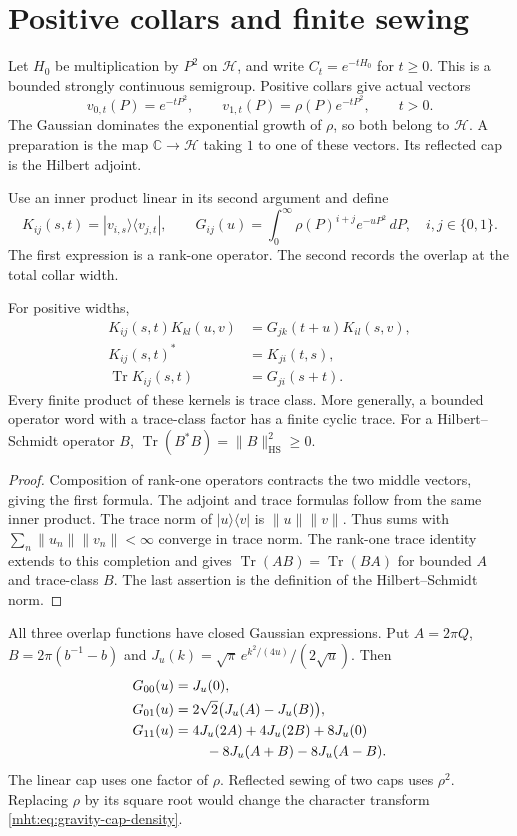 \section{Positive collars and finite sewing}

Let $H_0$ be multiplication by $P^2$ on $\mathcal H$, and write
$C_t=e^{-tH_0}$ for $t\geq0$. This is a bounded strongly continuous
semigroup. Positive collars give actual vectors
\[
 v_{0,t}(P)=e^{-tP^2},\qquad
 v_{1,t}(P)=\rho(P)e^{-tP^2},\qquad t>0.
\]
The Gaussian dominates the exponential growth of $\rho$, so both
belong to $\mathcal H$. A preparation is the map
$\mathbb C\to\mathcal H$ taking $1$ to one of these vectors.
Its reflected cap is the Hilbert adjoint.

Use an inner product linear in its second argument and define
\[
 K_{ij}(s,t)=|v_{i,s}\rangle\langle v_{j,t}|,\qquad
 G_{ij}(u)=\int_0^\infty\rho(P)^{i+j}e^{-uP^2}\,dP,
 \quad i,j\in\{0,1\}.
\]
The first expression is a rank-one operator. The second records the
overlap at the total collar width.

\begin{proposition}\label{mht:prop:gravity-prepared-sewing}
For positive widths,
\[
 \begin{split}
 K_{ij}(s,t)K_{k l}(u,v)
     &=G_{jk}(t+u)K_{i l}(s,v),\\
 K_{ij}(s,t)^*&=K_{ji}(t,s),\\
 \operatorname{Tr}K_{ij}(s,t)&=G_{ji}(s+t).
 \end{split}
\]
Every finite product of these kernels is trace class. More generally,
a bounded operator word with a trace-class factor has a finite cyclic
trace. For a Hilbert--Schmidt operator $B$,
$\operatorname{Tr}(B^*B)=\|B\|_{\mathrm{HS}}^2\geq0$.
\end{proposition}

\begin{proof}
Composition of rank-one operators contracts the two middle vectors,
giving the first formula. The adjoint and trace formulas follow from
the same inner product. The trace norm of $|u\rangle\langle v|$ is
$\|u\|\|v\|$. Thus sums with
$\sum_n\|u_n\|\|v_n\|<\infty$ converge in trace norm.
The rank-one trace identity extends to this completion and gives
$\operatorname{Tr}(AB)=\operatorname{Tr}(BA)$ for bounded $A$ and
trace-class $B$. The last assertion is the definition of the
Hilbert--Schmidt norm.
\end{proof}

All three overlap functions have closed Gaussian expressions. Put
$A=2\pi Q$, $B=2\pi(b^{-1}-b)$ and
$J_u(k)=\sqrt\pi\,e^{k^2/(4u)}/(2\sqrt u)$. Then
\[
 \begin{aligned}
 G_{00}(u)&=J_u(0),\\
 G_{01}(u)&=2\sqrt2\bigl(J_u(A)-J_u(B)\bigr),\\
 G_{11}(u)&=4J_u(2A)+4J_u(2B)+8J_u(0)\\
          &\hspace{8mm}-8J_u(A+B)-8J_u(A-B).
 \end{aligned}
\]
The linear cap uses one factor of $\rho$. Reflected sewing of two
caps uses $\rho^2$. Replacing $\rho$ by its square root would change
the character transform \eqref{mht:eq:gravity-cap-density}.

